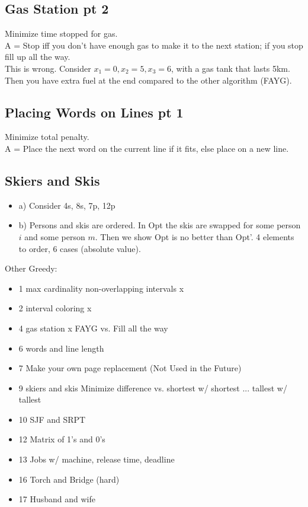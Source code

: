 \documentclass[12pt]{article}
\begin{document}
\subsection{Gas Station pt 2}
Minimize time stopped for gas.\\
A =  Stop iff you don't have enough gas to make it to the next station; if you stop fill up all the way.\\
This is wrong. Consider $x_1 = 0, x_2 = 5, x_3 = 6$, with a gas tank that lasts 5km. Then you have extra fuel at the end compared to the other algorithm (FAYG).

\subsection{Placing Words on Lines pt 1}
Minimize total penalty.\\
A = Place the next word on the current line if it fits, else place on a new line.


\subsection{Skiers and Skis}
\begin{itemize}
  \item a) Consider 4s, 8s, 7p, 12p
  \item b) Persons and skis are ordered. In Opt the skis are swapped for some person $i$ and some person $m$. Then we show Opt is no better than Opt'. 4 elements to order, 6 cases (absolute value).
\end{itemize}



Other Greedy:
\begin{itemize}
  \item 1 max cardinality non-overlapping intervals   x
  \item 2 interval coloring                           x
  \item 4 gas station                                 x
          FAYG vs. Fill all the way
  \item 6 words and line length
  \item 7 Make your own page replacement (Not Used in the Future)
  \item 9 skiers and skis
          Minimize difference vs. shortest w/ shortest ... tallest w/ tallest
  \item 10 SJF and SRPT
  \item 12 Matrix of 1's and 0's
  \item 13 Jobs w/ machine, release time, deadline
  \item 16 Torch and Bridge (hard)
  \item 17 Husband and wife
\end{itemize}
\end{document}
